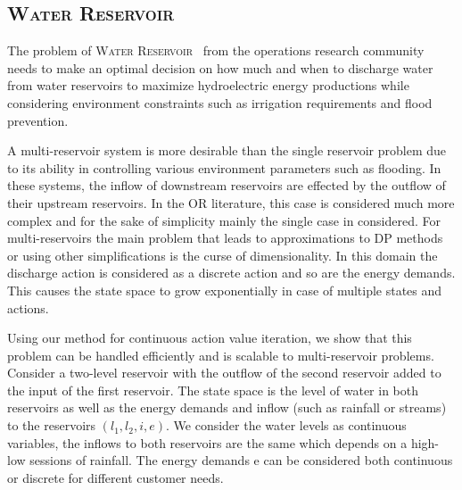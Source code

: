 \documentclass[letterpaper]{article}
\newcommand{\WaterReservoir}{\textsc{Water Reservoir}}
\begin{document}
\subsection{\WaterReservoir}

The problem of \WaterReservoir~\cite{reservoir} from the operations
research community needs to make an
optimal decision on how much and when to discharge water from water
reservoirs to maximize hydroelectric energy productions while considering
environment constraints such as irrigation requirements and flood
prevention.

A multi-reservoir system is more desirable than the single reservoir problem
due to its ability in controlling various environment parameters such as
flooding. In these systems, the inflow of downstream reservoirs are effected
by the outflow of their upstream reservoirs. In the OR literature, this case
is considered much more complex and for the sake of simplicity mainly the
single case in considered. For multi-reservoirs the main problem that leads
to approximations to DP methods or using other simplifications is the curse
of dimensionality. In this domain the discharge action is considered as a
discrete action and so are the energy demands. This causes the state space
to grow exponentially in case of multiple states and actions.

Using our method for continuous action value iteration, we show that this
problem can be handled efficiently and is scalable to multi-reservoir
problems. Consider a two-level reservoir with the outflow of the second
reservoir added to the input of the first reservoir. The state space is the
level of water in both reservoirs as well as the energy demands and inflow
(such as rainfall or streams) to the reservoirs $(l_1,l_2,i,e)$. We consider
the water levels as continuous variables, the inflows to both reservoirs are
the same which depends on a high-low sessions of rainfall. The energy
demands e can be considered both continuous or discrete for different
customer needs.
 
\end{document}

